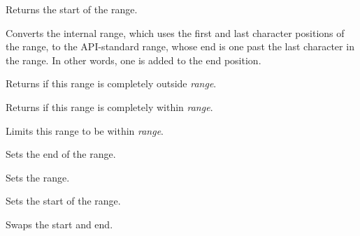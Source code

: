 
Returns the start of the range.

\label{wxrichtextrangefrominternal}


Converts the internal range, which uses the first and last character positions of the range,
to the API-standard range, whose end is one past the last character in the range.
In other words, one is added to the end position.

\label{wxrichtextrangeisoutside}


Returns \true if this range is completely outside {\it range}.

\label{wxrichtextrangeiswithin}


Returns \true if this range is completely within {\it range}.

\label{wxrichtextrangelimitto}


Limits this range to be within {\it range}.

\label{wxrichtextrangesetend}


Sets the end of the range.

\label{wxrichtextrangesetrange}


Sets the range.

\label{wxrichtextrangesetstart}


Sets the start of the range.

\label{wxrichtextrangeswap}


Swaps the start and end.

